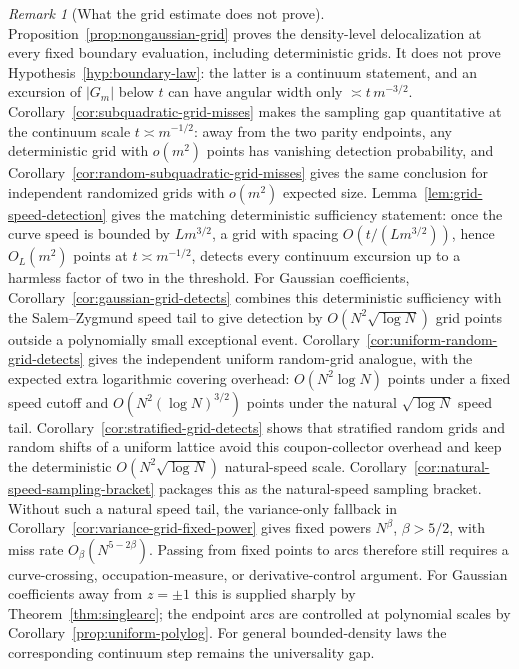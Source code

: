 \documentclass[11pt]{amsart}
\numberwithin{equation}{section}
\theoremstyle{definition}
\theoremstyle{remark}
\newtheorem{remark}[theorem]{Remark}
\newcommand{\abs}[1]{\left\lvert #1\right\rvert}
\begin{document}
\begin{remark}[What the grid estimate does not prove]\label{rem:grid-not-continuum}
Proposition~\ref{prop:nongaussian-grid} proves the density-level delocalization
at every fixed boundary evaluation, including deterministic grids.  It does not
prove Hypothesis~\ref{hyp:boundary-law}: the latter is a continuum statement,
and an excursion of \(\abs{G_m}\) below \(t\) can have angular width only
\(\asymp t\,m^{-3/2}\).  Corollary~\ref{cor:subquadratic-grid-misses} makes
the sampling gap quantitative at the continuum scale \(t\asymp m^{-1/2}\):
away from the two parity endpoints, any deterministic grid with \(o(m^2)\)
points has vanishing detection probability, and
Corollary~\ref{cor:random-subquadratic-grid-misses} gives the same conclusion
for independent randomized grids with \(o(m^2)\) expected size.
Lemma~\ref{lem:grid-speed-detection}
gives the matching deterministic sufficiency statement: once the curve speed is
bounded by \(Lm^{3/2}\), a grid with spacing \(O(t/(Lm^{3/2}))\), hence
\(O_L(m^2)\) points at \(t\asymp m^{-1/2}\), detects every continuum excursion
up to a harmless factor of two in the threshold.  For Gaussian coefficients,
Corollary~\ref{cor:gaussian-grid-detects} combines this deterministic
sufficiency with the Salem--Zygmund speed tail to give detection by
\(O(N^2\sqrt{\log N})\) grid points outside a polynomially small exceptional
event.  Corollary~\ref{cor:uniform-random-grid-detects} gives the independent
uniform random-grid analogue, with the expected extra logarithmic covering
overhead: \(O(N^2\log N)\) points under a fixed speed cutoff and
\(O(N^2(\log N)^{3/2})\) points under the natural \(\sqrt{\log N}\) speed tail.
Corollary~\ref{cor:stratified-grid-detects} shows that stratified random grids
and random shifts of a uniform lattice avoid this coupon-collector overhead and
keep the deterministic \(O(N^2\sqrt{\log N})\) natural-speed scale.
Corollary~\ref{cor:natural-speed-sampling-bracket} packages this as the
natural-speed sampling bracket.  Without such a natural speed tail, the
variance-only fallback in
Corollary~\ref{cor:variance-grid-fixed-power} gives fixed powers
\(N^\beta\), \(\beta>5/2\), with miss rate \(O_\beta(N^{5-2\beta})\).
Passing from fixed points to arcs therefore still requires a
curve-crossing, occupation-measure, or derivative-control argument.
For Gaussian coefficients away from \(z=\pm1\) this is supplied sharply by
Theorem~\ref{thm:singlearc}; the endpoint arcs are controlled at polynomial
scales by Corollary~\ref{prop:uniform-polylog}.  For general bounded-density
laws the corresponding continuum step remains the universality gap.
\end{remark}
\end{document}
